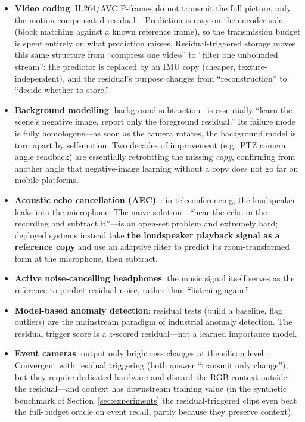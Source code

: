 \documentclass[12pt,a4paper]{article}
\begin{document}
\begin{itemize}
  \item \textbf{Video coding}: H.264/AVC P-frames do not transmit the full picture, only the motion-compensated residual~\cite{h264}. Prediction is easy on the encoder side (block matching against a known reference frame), so the transmission budget is spent entirely on what prediction misses. Residual-triggered storage moves this same structure from ``compress one video'' to ``filter one unbounded stream'': the predictor is replaced by an IMU copy (cheaper, texture-independent), and the residual's purpose changes from ``reconstruction'' to ``decide whether to store.''
  \item \textbf{Background modelling}: background subtraction~\cite{piccardi2004,bouwmans2014} is essentially ``learn the scene's negative image, report only the foreground residual.'' Its failure mode is fully homologous---as soon as the camera rotates, the background model is torn apart by self-motion. Two decades of improvement (e.g.\ PTZ camera angle readback) are essentially retrofitting the missing \emph{copy}, confirming from another angle that negative-image learning without a copy does not go far on mobile platforms.
  \item \textbf{Acoustic echo cancellation (AEC)}~\cite{benesty2001}: in teleconferencing, the loudspeaker leaks into the microphone. The naive solution---``hear the echo in the recording and subtract it''---is an open-set problem and extremely hard; deployed systems instead take \textbf{the loudspeaker playback signal as a reference copy} and use an adaptive filter to predict its room-transformed form at the microphone, then subtract.
  \item \textbf{Active noise-cancelling headphones}: the music signal itself serves as the reference to predict residual noise, rather than ``listening again.''
  \item \textbf{Model-based anomaly detection}: residual tests (build a baseline, flag outliers) are the mainstream paradigm of industrial anomaly detection. The residual trigger score is a $z$-scored residual---not a learned importance model.
  \item \textbf{Event cameras}: output only brightness changes at the silicon level~\cite{gallego2020}. Convergent with residual triggering (both answer ``transmit only change''), but they require dedicated hardware and discard the RGB context outside the residual---and context has downstream training value (in the synthetic benchmark of Section~\ref{sec:experiments} the residual-triggered clips even beat the full-budget oracle on event recall, partly because they preserve context).
\end{itemize}
\end{document}

